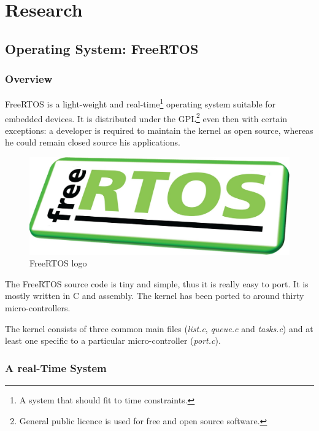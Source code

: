 \chapter{Research}\label{chap:research}

\section{Operating System: FreeRTOS}

\subsection{Overview}

\hspace{15mm}FreeRTOS is a light-weight and real-time\footnote{A system that should fit to time constraints.} operating system suitable for embedded devices. It is distributed under the GPL\footnote{General public licence is used for free and open source software.} even then with certain exceptions: a developer is required to maintain the kernel as open source, whereas he could remain closed source his applications.

\begin{figure}[h]
  \centering
  \includegraphics[scale=0.125]{images/freertos.jpg}
  \caption{FreeRTOS logo}
\end{figure}

The FreeRTOS source code is tiny and simple, thus it is really easy to port. It is mostly written in C and assembly. The kernel has been ported to around thirty micro-controllers.

The kernel consists of three common main files (\textit{list.c}, \textit{queue.c} and \textit{tasks.c}) and at least one specific to a particular micro-controller (\textit{port.c}).



\subsection{A real-Time System}

